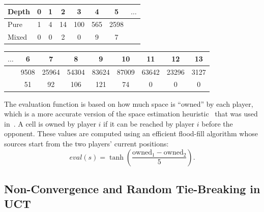\vspace{0.1cm}

\begin{center}
\small
\begin{flushleft}
\begin{tabular}{|l|c|c|c|c|c|c|c|}
\hline Depth & 0 & 1 & 2 & 3 & 4 & 5 & $\ldots$\\
\hline Pure  & 1 & 4 & 14 & 100 & 565 & 2598 & \\
\hline Mixed & 0 & 0 & 2 & 0 & 9 & 7 & \\
\hline
\end{tabular}
\end{flushleft}
\begin{flushright}
\begin{tabular}{|c|c|c|c|c|c|c|c|c|}
\hline  $\ldots$ & 6 & 7 & 8 & 9 & 10 & 11 & 12 & 13\\
\hline  & 9508 & 25964 & 54304 & 83624 & 87009 & 63642 & 23296 & 3127\\
\hline  & 51 & 92 & 106 & 121 & 74 & 0 & 0 & 0 \\
\hline
\end{tabular}
\end{flushright}
\end{center}

\vspace{0.1cm}

The evaluation function is based on how much space is ``owned'' by each player, which is a more accurate version of the space estimation
heuristic~\cite{DenTeuling12Tron} that was used in~\cite{Lanctot13Tron}. A cell is owned by player $i$ if it can be reached
by player $i$ before the opponent. These values are computed using an efficient flood-fill algorithm whose sources start from the two players'
current positions:
\[
eval(s) = \tanh\left(\frac{\textrm{owned}_1 - \textrm{owned}_2}{5}\right).
\]


\subsection{Non-Convergence and Random Tie-Breaking in UCT}\label{sec:exp:brps}

